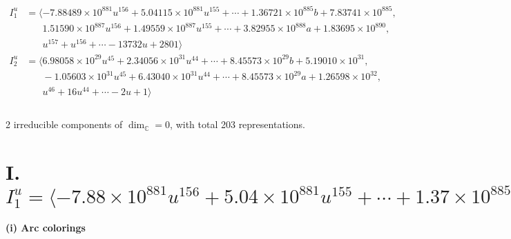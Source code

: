 \documentclass[1p]{elsarticle_modified}
\theoremstyle{definition}
\begin{document}
\begin{align*}
I^u_{1}&=\langle 
-7.88489\times10^{881} u^{156}+5.04115\times10^{881} u^{155}+\cdots+1.36721\times10^{885} b+7.83741\times10^{885},\\
\phantom{I^u_{1}}&\phantom{= \langle  }1.51590\times10^{887} u^{156}+1.49559\times10^{887} u^{155}+\cdots+3.82955\times10^{888} a+1.83695\times10^{890},\\
\phantom{I^u_{1}}&\phantom{= \langle  }u^{157}+u^{156}+\cdots-13732 u+2801\rangle \\
I^u_{2}&=\langle 
6.98058\times10^{29} u^{45}+2.34056\times10^{31} u^{44}+\cdots+8.45573\times10^{29} b+5.19010\times10^{31},\\
\phantom{I^u_{2}}&\phantom{= \langle  }-1.05603\times10^{31} u^{45}+6.43040\times10^{31} u^{44}+\cdots+8.45573\times10^{29} a+1.26598\times10^{32},\\
\phantom{I^u_{2}}&\phantom{= \langle  }u^{46}+16 u^{44}+\cdots-2 u+1\rangle \\
\\
\end{align*}
\raggedright * 2 irreducible components of $\dim_{\mathbb{C}}=0$, with total 203 representations.\\
\newpage
\renewcommand{\arraystretch}{1}
\centering \section*{I. $I^u_{1}= \langle -7.88\times10^{881} u^{156}+5.04\times10^{881} u^{155}+\cdots+1.37\times10^{885} b+7.84\times10^{885},\;1.52\times10^{887} u^{156}+1.50\times10^{887} u^{155}+\cdots+3.83\times10^{888} a+1.84\times10^{890},\;u^{157}+u^{156}+\cdots-13732 u+2801 \rangle$}
\flushleft \textbf{(i) Arc colorings}\\
\end{document}

